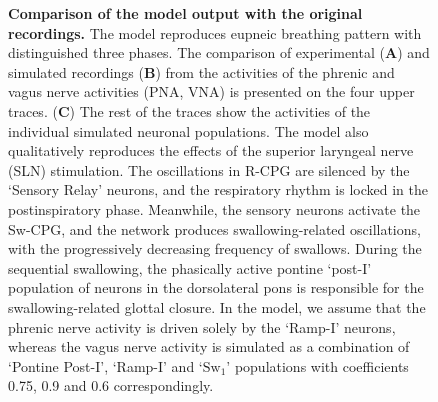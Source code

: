 \documentclass[pdflatex,sn-mathphys-ay]{sn-jnl}%
\theoremstyle{thmstyleone}%
\theoremstyle{thmstyletwo}%
\theoremstyle{thmstylethree}%
\begin{document}
\begin{figure}
 \begin{center}
 \end{center}
 \caption{\textbf{Comparison of the model output with the original recordings.}
 The model reproduces eupneic breathing pattern with distinguished three phases. The comparison of experimental (\textbf{A}) and simulated recordings (\textbf{B}) from the activities of the phrenic and vagus nerve activities (PNA, VNA) is presented on the four upper traces. (\textbf{C}) The rest of the traces show the activities of the individual simulated neuronal populations. 
 The model also qualitatively reproduces the effects of the superior laryngeal nerve (SLN) stimulation. The oscillations in R-CPG are silenced by the `Sensory Relay' neurons, and the respiratory rhythm is locked in the postinspiratory phase. Meanwhile, the sensory neurons activate the Sw-CPG, and the network produces swallowing-related oscillations, with the progressively decreasing frequency of swallows. During the sequential swallowing, the phasically active pontine `post-I' population of neurons in the dorsolateral pons is responsible for the swallowing-related glottal closure. In the model, we assume that the phrenic nerve activity is driven solely by the `Ramp-I' neurons, whereas the vagus nerve activity is simulated as a combination of `Pontine Post-I', `Ramp-I' and `$\text{Sw}_1$' populations with coefficients 0.75, 0.9 and 0.6 correspondingly.
}\label{fig: swallowing_and_eupneic_breathing}
\end{figure}
\end{document}
